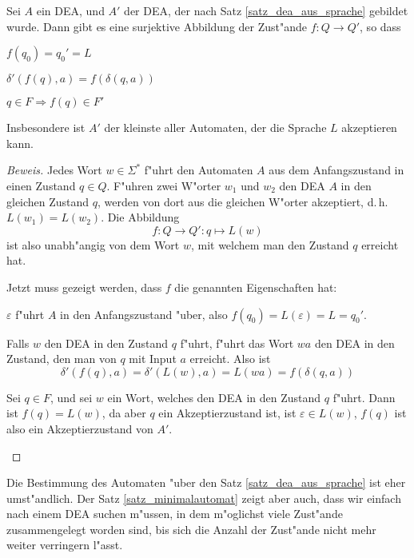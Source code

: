 \begin{satz}[Minimalautomat]\label{satz_minimalautomat}
Sei $A$ ein DEA, und $A'$ der DEA, der nach
Satz \ref{satz_dea_aus_sprache} gebildet wurde. Dann gibt es
eine surjektive Abbildung der Zust"ande $f\colon Q\to Q'$, so dass
\begin{compactenum}
\item $f(q_0)=q_0'=L$
\item $\delta'(f(q),a)=f(\delta(q,a))$
\item $q\in F\Rightarrow f(q)\in F'$
\end{compactenum}
Insbesondere ist $A'$ der kleinste aller Automaten, der die Sprache
$L$ akzeptieren kann.
\end{satz}

\begin{proof}[Beweis]
Jedes Wort $w\in\Sigma^*$ f"uhrt den Automaten $A$ aus dem
Anfangszustand in einen Zustand $q\in Q$. F"uhren zwei W"orter
$w_1$ und $w_2$ den DEA $A$ in den gleichen Zustand $q$, werden
von dort aus die gleichen W"orter akzeptiert, d.\,h.~$L(w_1)=L(w_2)$.
Die Abbildung
\[
f\colon Q\to Q': q\mapsto L(w)
\]
ist also unabh"angig von dem Wort $w$, mit welchem man den Zustand $q$
erreicht hat. 

Jetzt muss gezeigt werden, dass $f$ die genannten Eigenschaften hat:
\begin{compactenum}
\item
$\varepsilon$ f"uhrt $A$ in den Anfangszustand "uber, also
$f(q_0)=L(\varepsilon)=L=q_0'$.
\item Falls $w$ den DEA in den Zustand $q$ f"uhrt, f"uhrt das Wort
$wa$ den DEA in den Zustand, den man von $q$ mit Input $a$ erreicht.
Also ist
\[
\delta'(f(q),a)=\delta'(L(w), a)=L(wa)=f(\delta(q,a))
\]
\item Sei $q\in F$, und sei $w$ ein Wort, welches den DEA in den Zustand 
$q$ f"uhrt. Dann ist $f(q)=L(w)$, da aber $q$ ein Akzeptierzustand ist,
ist $\varepsilon\in L(w)$, $f(q)$ ist also ein Akzeptierzustand von
$A'$.
\end{compactenum}

\end{proof}

Die Bestimmung des Automaten "uber den Satz \ref{satz_dea_aus_sprache}
ist eher umst"andlich. Der Satz \ref{satz_minimalautomat} zeigt
aber auch, dass wir einfach nach einem DEA suchen m"ussen, in dem
m"oglichst viele Zust"ande zusammengelegt worden sind, bis sich die
Anzahl der Zust"ande nicht mehr weiter verringern l"asst.

